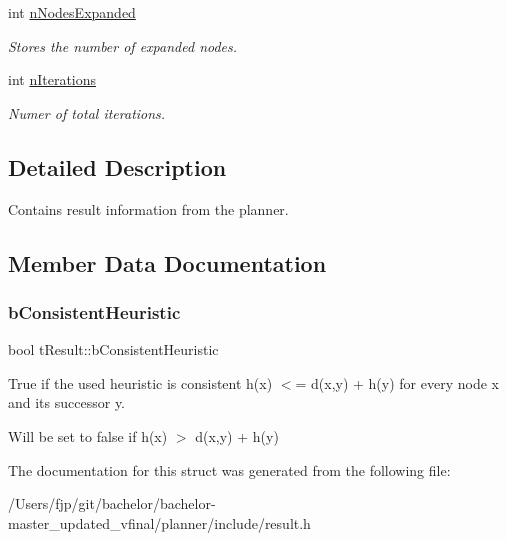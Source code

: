 \begin{DoxyCompactItemize}
\mbox{\label{structt_result_aeec87653572128a631adb83face701ee}} 
int \mbox{\hyperlink{structt_result_aeec87653572128a631adb83face701ee}{n\+Nodes\+Expanded}}
\begin{DoxyCompactList}\small\item\em Stores the number of expanded nodes. \end{DoxyCompactList}\item 
\mbox{\label{structt_result_ae43cdacfd85c009a19f17af62adf8729}} 
int \mbox{\hyperlink{structt_result_ae43cdacfd85c009a19f17af62adf8729}{n\+Iterations}}
\begin{DoxyCompactList}\small\item\em Numer of total iterations. \end{DoxyCompactList}\end{DoxyCompactItemize}


\subsection{Detailed Description}
Contains result information from the planner. 

\subsection{Member Data Documentation}
\mbox{\label{structt_result_a7d87aab6411a466aed07a27a70eeded2}} 
\subsubsection{\texorpdfstring{b\+Consistent\+Heuristic}{bConsistentHeuristic}}
{\footnotesize\ttfamily bool t\+Result\+::b\+Consistent\+Heuristic}



True if the used heuristic is consistent h(x) $<$= d(x,y) + h(y) for every node x and its successor y. 

Will be set to false if h(x) $>$ d(x,y) + h(y) 

The documentation for this struct was generated from the following file\+:\begin{DoxyCompactItemize}
\item 
/\+Users/fjp/git/bachelor/bachelor-\/master\+\_\+updated\+\_\+vfinal/planner/include/result.\+h\end{DoxyCompactItemize}
